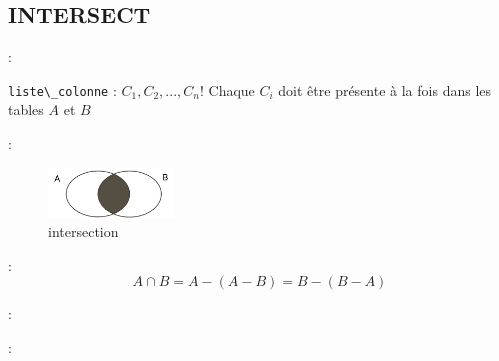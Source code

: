 \documentclass[10pt]{beamer}
\begin{document}
\subsection{INTERSECT}
\begin{frame}{\secname : \subsecname}
    
    \lstinline[language=bnf]!liste\_colonne! : $C_1, C_2, ... , C_n$!
    Chaque $C_i$ doit être présente à la fois dans les tables $A$ et $B$
\end{frame}

\begin{frame}{\secname : \subsecname}
    
    \begin{figure}
        \begin{center}
            \includegraphics[width=0.3\textwidth]{../assets/img/intersection.pdf}
            \caption{intersection}
        \end{center}
    \end{figure}
\end{frame}

\begin{frame}{\secname : \subsecname}
    $$
        A \cap B = A - (A-B) = B- (B-A)
    $$
    
\end{frame}

\begin{frame}{\secname : \subsecname}
    
\end{frame}

\begin{frame}{\secname : \subsecname}
    
\end{frame}
\end{document}
